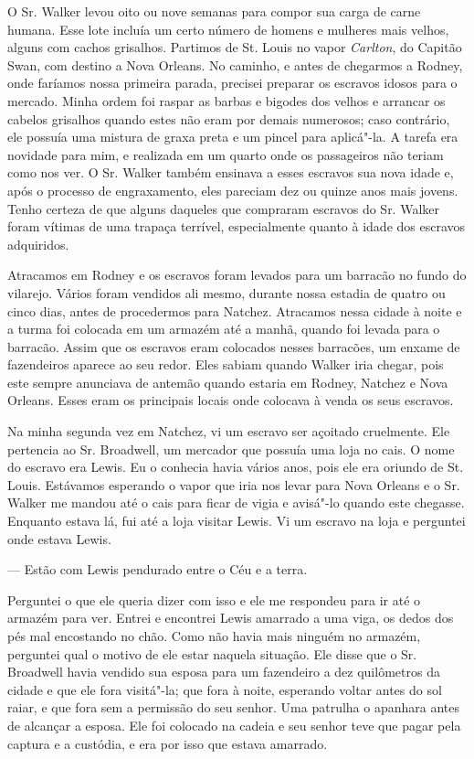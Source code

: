 O Sr. Walker levou oito ou nove semanas para compor sua carga de carne
humana. Esse lote incluía um certo número de homens e mulheres mais
velhos, alguns com cachos grisalhos. Partimos de St. Louis no vapor
\emph{Carlton}, do Capitão Swan, com destino a Nova Orleans. No caminho,
e antes de chegarmos a Rodney, onde faríamos nossa primeira parada,
precisei preparar os escravos idosos para o mercado. Minha ordem foi
raspar as barbas e bigodes dos velhos e arrancar os cabelos grisalhos
quando estes não eram por demais numerosos; caso contrário, ele possuía
uma mistura de graxa preta e um pincel para aplicá"-la. A tarefa era \label{ref7}
novidade para mim, e realizada em um quarto onde os passageiros não
teriam como nos ver. O Sr. Walker também ensinava a esses escravos sua
nova idade e, após o processo de engraxamento, eles pareciam dez ou
quinze anos mais jovens. Tenho certeza de que alguns daqueles que
compraram escravos do Sr. Walker foram vítimas de uma trapaça terrível,
especialmente quanto à idade dos escravos adquiridos.

Atracamos em Rodney e os escravos foram levados para um barracão no
fundo do vilarejo. Vários foram vendidos ali mesmo, durante nossa
estadia de quatro ou cinco dias, antes de procedermos para Natchez.
Atracamos nessa cidade à noite e a turma foi colocada em um armazém até
a manhã, quando foi levada para o barracão. Assim que os escravos eram
colocados nesses barracões, um enxame de fazendeiros aparece ao seu
redor. Eles sabiam quando Walker iria chegar, pois este sempre anunciava
de antemão quando estaria em Rodney, Natchez e Nova Orleans. Esses eram
os principais locais onde colocava à venda os seus escravos.

Na minha segunda vez em Natchez, vi um escravo ser açoitado cruelmente.
Ele pertencia ao Sr. Broadwell, um mercador que possuía uma loja no
cais. O nome do escravo era Lewis. Eu o conhecia havia vários anos, pois
ele era oriundo de St. Louis. Estávamos esperando o vapor que iria nos
levar para Nova Orleans e o Sr. Walker me mandou até o cais para ficar
de vigia e avisá"-lo quando este chegasse. Enquanto estava lá, fui até a
loja visitar Lewis. Vi um escravo na loja e perguntei onde estava Lewis.

--- Estão com Lewis pendurado entre o Céu e a terra.

Perguntei o que ele queria dizer com isso e ele me respondeu para ir até
o armazém para ver. Entrei e encontrei Lewis amarrado a uma viga, os
dedos dos pés mal encostando no chão. Como não havia mais ninguém no
armazém, perguntei qual o motivo de ele estar naquela situação. Ele
disse que o Sr. Broadwell havia vendido sua esposa para um fazendeiro a
dez quilômetros da cidade e que ele fora visitá"-la; que fora à noite,
esperando voltar antes do sol raiar, e que fora sem a permissão do seu
senhor. Uma patrulha o apanhara antes de alcançar a esposa. Ele foi
colocado na cadeia e seu senhor teve que pagar pela captura e a
custódia, e era por isso que estava amarrado.

